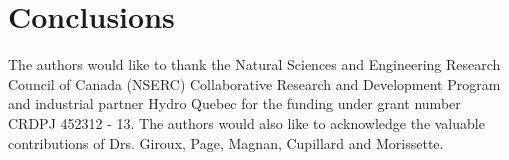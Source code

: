 \documentclass[twocolumn,10pt]{asme2ej}
\begin{document}
\section{Conclusions}


\begin{acknowledgment}
The authors would like to thank the Natural Sciences and Engineering Research Council of Canada (NSERC) Collaborative Research and Development Program and industrial partner Hydro Quebec for the funding under grant number CRDPJ 452312 - 13. The authors would also like to acknowledge the valuable contributions of Drs. Giroux, Page, Magnan, Cupillard and Morissette.
\end{acknowledgment}
\FloatBarrier
%




%

%
\end{document}
